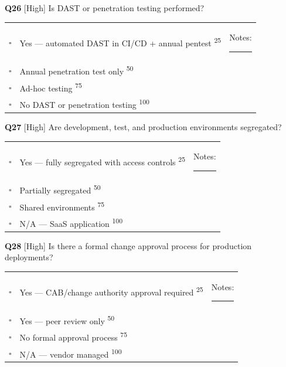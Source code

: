 \documentclass[11pt,landscape]{article}
\begin{document}
\vspace{0.3cm}

\noindent\colorbox{highbg}{\textbf{Q26} [High]} Is DAST or penetration testing performed?

\begin{tabularx}{\textwidth}{cXX}
$\square$ & Yes --- automated DAST in CI/CD + annual pentest \textsuperscript{\scriptsize\textcolor{stridegray}{25}} & Notes: \rule{4cm}{0.4pt} \\
$\square$ & Annual penetration test only \textsuperscript{\scriptsize\textcolor{stridegray}{50}} &  \\
$\square$ & Ad-hoc testing \textsuperscript{\scriptsize\textcolor{stridegray}{75}} &  \\
$\square$ & No DAST or penetration testing \textsuperscript{\scriptsize\textcolor{stridegray}{100}} &  \\
\end{tabularx}

\vspace{0.3cm}

\noindent\colorbox{highbg}{\textbf{Q27} [High]} Are development, test, and production environments segregated?

\begin{tabularx}{\textwidth}{cXX}
$\square$ & Yes --- fully segregated with access controls \textsuperscript{\scriptsize\textcolor{stridegray}{25}} & Notes: \rule{4cm}{0.4pt} \\
$\square$ & Partially segregated \textsuperscript{\scriptsize\textcolor{stridegray}{50}} &  \\
$\square$ & Shared environments \textsuperscript{\scriptsize\textcolor{stridegray}{75}} &  \\
$\square$ & N/A --- SaaS application \textsuperscript{\scriptsize\textcolor{stridegray}{100}} &  \\
\end{tabularx}

\vspace{0.3cm}

\noindent\colorbox{highbg}{\textbf{Q28} [High]} Is there a formal change approval process for production deployments?

\begin{tabularx}{\textwidth}{cXX}
$\square$ & Yes --- CAB/change authority approval required \textsuperscript{\scriptsize\textcolor{stridegray}{25}} & Notes: \rule{4cm}{0.4pt} \\
$\square$ & Yes --- peer review only \textsuperscript{\scriptsize\textcolor{stridegray}{50}} &  \\
$\square$ & No formal approval process \textsuperscript{\scriptsize\textcolor{stridegray}{75}} &  \\
$\square$ & N/A --- vendor managed \textsuperscript{\scriptsize\textcolor{stridegray}{100}} &  \\
\end{tabularx}
\end{document}
